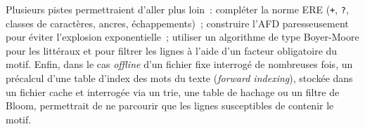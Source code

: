 \documentclass[11pt,a4paper]{article}
\begin{document}
Plusieurs pistes permettraient d'aller plus loin~: compléter la norme ERE
(\texttt{+}, \texttt{?}, classes de caractères, ancres, échappements)~;
construire l'AFD paresseusement pour éviter l'explosion exponentielle~;
utiliser un algorithme de type Boyer-Moore pour les littéraux et pour filtrer
les lignes à l'aide d'un facteur obligatoire du motif. Enfin, dans le cas
\emph{offline} d'un fichier fixe interrogé de nombreuses fois, un précalcul
d'une table d'index des mots du texte (\emph{forward indexing}), stockée dans
un fichier cache et interrogée via un trie, une table de hachage ou un filtre
de Bloom, permettrait de ne parcourir que les lignes susceptibles de
contenir le motif.



\end{document}
